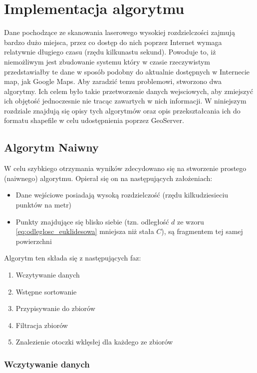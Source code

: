 \chapter{Implementacja algorytmu}

Dane pochodzące ze skanowania laserowego wysokiej rozdzielczości zajmują bardzo dużo miejsca, przez co
dostęp do nich poprzez Internet wymaga relatywnie długiego czasu (rzędu kilkunastu sekund). Powoduje to,
iż niemożliwym jest zbudowanie systemu który w czasie rzeczywistym przedstawiałby te dane w sposób podobny
do aktualnie dostępnych w Internecie map, jak Google Maps. Aby zaradzić temu problemowi, stworzono dwa algorytmy.
Ich celem było takie przetworzenie danych wejsciowych, aby zmiejszyć ich objętość jednoczesnie nie tracąc zawartych w nich informacji.
W niniejszym rozdziale znajdują się opisy tych algorytmów oraz opis przekształcania ich do formatu shapefile w celu udostępnienia
poprzez GeoServer.

\section{Algorytm Naiwny}

W celu szybkiego otrzymania wyników zdecydowano się na stworzenie prostego (naiwnego) algorytmu. Opierał się on na następujących założeniach:
\begin{itemize}
    \item Dane wejściowe posiadają wysoką rozdzielczość (rzędu kilkudziesieciu punktów na metr)
    \item Punkty znajdujące się blisko siebie (tzn. odległość $d$ ze wzoru \ref{eq:odleglosc_euklidesowa} mniejsza niż stała $C$), są fragmentem tej samej powierzchni
\end{itemize}

\noindent Algorytm ten składa się z następujących faz:
\begin{enumerate}
    \item Wczytywanie danych
    \item Wstępne sortowanie
    \item Przypisywanie do zbiorów
    \item Filtracja zbiorów
    \item Znalezienie otoczki wklęsłej dla każdego ze zbiorów
\end{enumerate}

\subsection{Wczytywanie danych}

